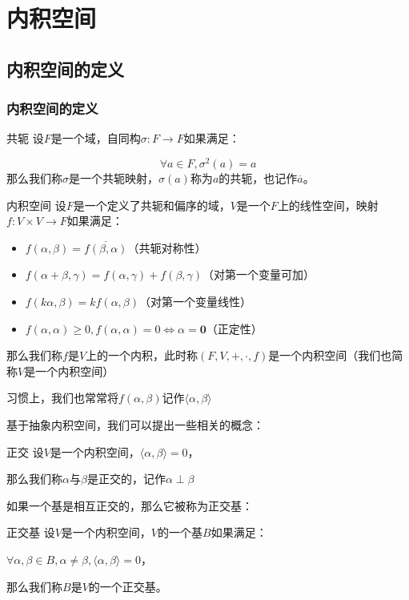 \documentclass[12pt, a4paper, oneside, UTF8]{ctexbook}
\begin{document}
% 
\else
\fi
\chapter{内积空间}
	\section{内积空间的定义}
		\subsection{内积空间的定义}
			\begin{defn}{共轭}{}
				设$F$是一个域，自同构$\sigma : F \to F$如果满足：

				\begin{equation}
					\forall a \in F,\sigma^2(a)=a
				\end{equation}
				那么我们称$\sigma $是一个共轭映射，$\sigma (a)$称为$a$的共轭，也记作$\overline{a}$。
			\end{defn}
			\begin{defn}{内积空间}{}
				设$F$是一个定义了共轭和偏序的域，$V$是一个$F$上的线性空间，映射$f:V \times V \to F$如果满足：

				\begin{itemize}
					\item $f(\alpha ,\beta )=\overline{f(\beta ,\alpha )}$（共轭对称性）
					\item $f(\alpha +\beta ,\gamma )=f(\alpha ,\gamma )+f(\beta ,\gamma )$（对第一个变量可加）
					\item $f(k\alpha ,\beta )=kf(\alpha ,\beta )$（对第一个变量线性）
					\item $f(\alpha ,\alpha )\geqslant 0,f(\alpha ,\alpha )=0 \Leftrightarrow \alpha =\mathbf{0}$（正定性）
				\end{itemize}
				那么我们称$f$是$V$上的一个内积，此时称$(F,V,+,\cdot,f)$是一个内积空间（我们也简称$V$是一个内积空间）

				习惯上，我们也常常将$f(\alpha ,\beta )$记作$\langle \alpha ,\beta \rangle $
			\end{defn}
			基于抽象内积空间，我们可以提出一些相关的概念：
			\begin{defn}{正交}{}
				设$V$是一个内积空间，$\langle \alpha ,\beta \rangle =0$，
				
				那么我们称$\alpha $与$\beta $是正交的，记作$\alpha \perp \beta $
			\end{defn}
			如果一个基是相互正交的，那么它被称为正交基：
			\begin{defn}{正交基}{}
				设$V$是一个内积空间，$V$的一个基$B$如果满足：

				$\forall \alpha ,\beta \in B,\alpha \neq \beta ,\langle \alpha ,\beta \rangle =0$，
				
				那么我们称$B$是$V$的一个正交基。
			\end{defn}
\end{document}
